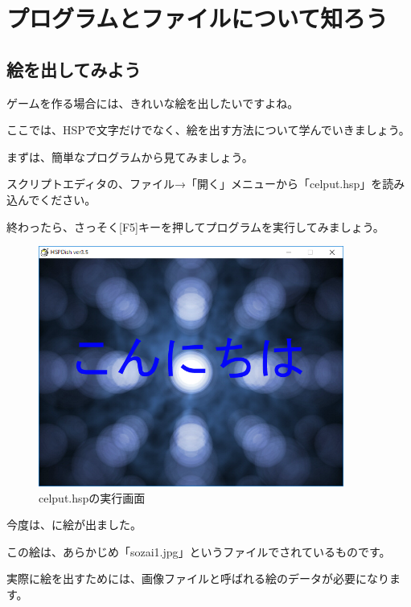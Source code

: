 \newpage
\section{プログラムとファイルについて知ろう}


\subsection{絵を出してみよう}


ゲームを作る場合には、きれいな絵を出したいですよね。

ここでは、HSPで文字だけでなく、絵を出す方法について学んでいきましょう。

\bigskip

まずは、簡単なプログラムから見てみましょう。

スクリプトエディタの、ファイル→「開く」メニューから「celput.hsp」を読み込んでください。

終わったら、さっそく[F5]キーを押してプログラムを実行してみましょう。


\begin{figure}[H]
    \begin{center}
      \includegraphics[keepaspectratio,width=10.028cm,height=7.909cm]{text04-img/text04-img012.png}
      \caption{celput.hspの実行画面}
    \end{center}
    \label{fig:prog_menu}
\end{figure}


今度は、に絵が出ました。

この絵は、あらかじめ「sozai1.jpg」というファイルでされているものです。

実際に絵を出すためには、画像ファイルと呼ばれる絵のデータが必要になります。

